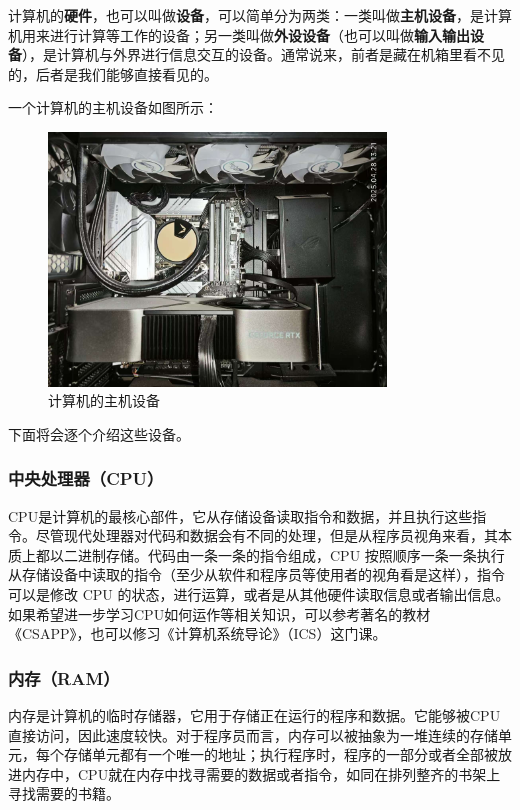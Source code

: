 \documentclass[../main.tex]{subfiles}
\begin{document}
计算机的\textbf{硬件}，也可以叫做\textbf{设备}，可以简单分为两类：一类叫做\textbf{主机设备}，是计算机用来进行计算等工作的设备；另一类叫做\textbf{外设设备}（也可以叫做\textbf{输入输出设备}），是计算机与外界进行信息交互的设备。通常说来，前者是藏在机箱里看不见的，后者是我们能够直接看见的。

一个计算机的主机设备如图所示：
\begin{figure}[htbp]
  \centering
  \includegraphics[width=0.8\textwidth]{images/hardware1.jpg}
  \caption{计算机的主机设备}
  \label{fig:computer-hardware}
\end{figure}

下面将会逐个介绍这些设备。

\subsubsection{中央处理器（CPU）}

CPU是计算机的最核心部件，它从存储设备读取指令和数据，并且执行这些指令。尽管现代处理器对代码和数据会有不同的处理，但是从程序员视角来看，其本质上都以二进制存储。代码由一条一条的指令组成，CPU 按照顺序一条一条执行从存储设备中读取的指令（至少从软件和程序员等使用者的视角看是这样），指令可以是修改 CPU 的状态，进行运算，或者是从其他硬件读取信息或者输出信息。如果希望进一步学习CPU如何运作等相关知识，可以参考著名的教材《CSAPP》，也可以修习《计算机系统导论》（ICS）这门课。

\subsubsection{内存（RAM）}

内存是计算机的临时存储器，它用于存储正在运行的程序和数据。它能够被CPU直接访问，因此速度较快。对于程序员而言，内存可以被抽象为一堆连续的存储单元，每个存储单元都有一个唯一的地址；执行程序时，程序的一部分或者全部被放进内存中，CPU就在内存中找寻需要的数据或者指令，如同在排列整齐的书架上寻找需要的书籍。
\end{document}
